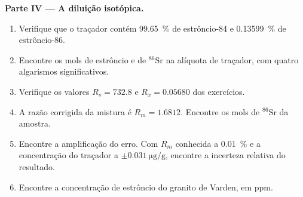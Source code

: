 \begin{problem}
\noindent\textbf{Parte IV --- A diluição isotópica.}
\begin{enumerate}[resume]
  \item Verifique que o traçador contém \qty{99.65}{\percent} de estrôncio-84 e \qty{0.13599}{\percent}
        de estrôncio-86.
  \item Encontre os mols de estrôncio e de $^{86}\mathrm{Sr}$ na alíquota de traçador, com quatro
        algarismos significativos.
  \item Verifique os valores $R_s = 732.8$ e $R_x = 0.05680$ dos exercícios.
  \item A razão corrigida da mistura é $R_m = 1.6812$. Encontre os mols de $^{86}\mathrm{Sr}$
        da amostra.
  \item Encontre a amplificação do erro. Com $R_m$ conhecida a \qty{0.01}{\percent} e a concentração
        do traçador a $\pm\qty{0.031}{\micro\gram\per\gram}$, encontre a incerteza relativa
        do resultado.
  \item Encontre a concentração de estrôncio do granito de Varden, em ppm.
\end{enumerate}
\end{problem}
